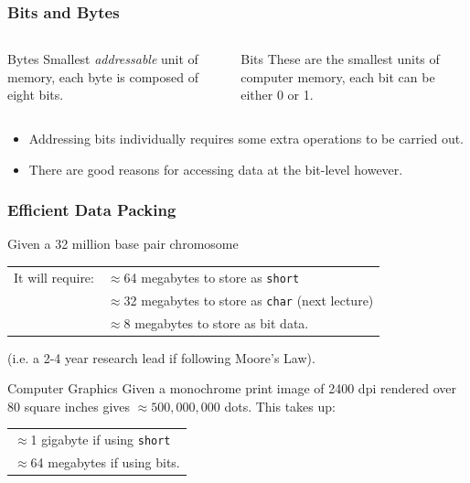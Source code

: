 \documentclass[table]{beamer}
\begin{document}
\begin{frame}
\frametitle{Bits and Bytes}
\begin{columns}
\begin{column}{5cm}
\begin{block}{Bytes}
Smallest \emph{addressable} unit of memory, each byte is composed of eight bits.
\end{block}
\end{column}
\begin{column}{5cm}
\begin{block}{Bits}
These are the smallest units of computer memory, each bit can be either 0 or 1.
\end{block}
\end{column}
\end{columns}
\vspace{0.2in}
\begin{itemize}
\item Addressing bits individually requires some extra operations to be carried out.
\item There are good reasons for accessing data at the bit-level however.
\end{itemize}
\end{frame}

\begin{frame}
\frametitle{Efficient Data Packing}
\begin{block}{Given a 32 million base pair chromosome}
\begin{tabular}{l l}
It will require: &$\approx$64 megabytes to store as {\tt short}\\
&$\approx$32 megabytes to store as {\tt char} (next lecture)\\
&$\approx$8 megabytes to store as bit data.
\end{tabular}
(i.e. a 2-4 year research lead if following Moore's Law).
\end{block}
\begin{block}{Computer Graphics}
Given a monochrome print image of 2400 dpi rendered over 80 square inches gives $\approx 500,000,000$ dots. This takes up:
\begin{center}
\begin{tabular}{l}
$\approx$1 gigabyte if using {\tt short}\\
$\approx$64 megabytes if using bits.
\end{tabular}
\end{center}
\end{block}
\end{frame}
\end{document}
